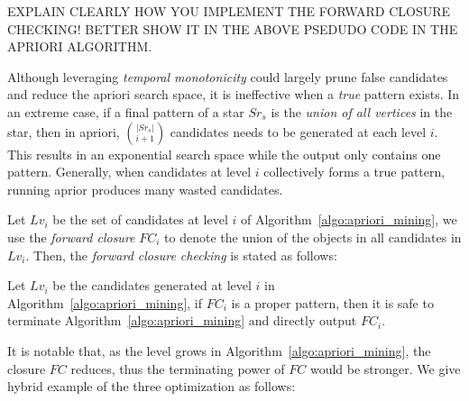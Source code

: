 





EXPLAIN CLEARLY HOW YOU IMPLEMENT THE FORWARD CLOSURE CHECKING! BETTER SHOW IT IN THE ABOVE PSEDUDO CODE IN THE APRIORI ALGORITHM.

Although leveraging \emph{temporal monotonicity} could largely prune
false candidates and reduce the apriori search space, 
it is ineffective when a \textit{true} pattern exists. 
In an extreme case, if a final pattern of a star $Sr_s$ is 
the \textit{union of all vertices} in the star,
then in apriori, ${|Sr_s|}\choose{i + 1}$ candidates needs to be generated at 
each level $i$. This results in an exponential search space while
the output only contains one pattern.  
Generally, when candidates at level $i$ collectively forms a true pattern, 
running aprior produces many wasted candidates. 

Let $Lv_i$ be the set of candidates at level $i$ of Algorithm~\ref{algo:apriori_mining},
we use the \emph{forward closure} $FC_i$ to denote the union of the objects in
all candidates in $Lv_i$. Then, the \emph{forward closure checking} is stated as follows:
\begin{theorem}
\label{THM:SPM_FCC}
Let $Lv_i$ be the candidates generated at level $i$ in Algorithm~\ref{algo:apriori_mining},
if $FC_i$ is a proper pattern, then it is safe to terminate Algorithm~\ref{algo:apriori_mining}
and directly output $FC_i$.
\end{theorem}


It is notable that, as the level grows in Algorithm~\ref{algo:apriori_mining}, the closure $FC$
reduces, thus the terminating power of $FC$ would be stronger. We give hybrid example of the three
optimization as follows:
%

